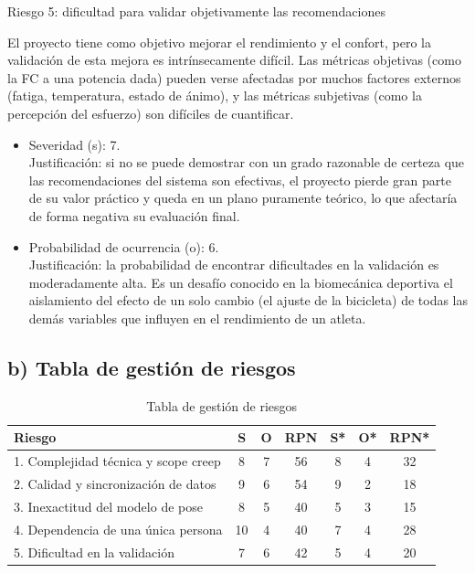 \documentclass[
11pt, %
]{charter}
\begin{document}
Riesgo 5: dificultad para validar objetivamente las recomendaciones

El proyecto tiene como objetivo mejorar el rendimiento y el confort, pero la validación de esta mejora es intrínsecamente difícil. Las métricas objetivas (como la FC a una potencia dada) pueden verse afectadas por muchos factores externos (fatiga, temperatura, estado de ánimo), y las métricas subjetivas (como la percepción del esfuerzo) son difíciles de cuantificar.
\begin{itemize}
    \item Severidad (s): 7.\\
    Justificación: si no se puede demostrar con un grado razonable de certeza que las recomendaciones del sistema son efectivas, el proyecto pierde gran parte de su valor práctico y queda en un plano puramente teórico, lo que afectaría de forma negativa su evaluación final.
    \item Probabilidad de ocurrencia (o): 6.\\
    Justificación: la probabilidad de encontrar dificultades en la validación es moderadamente alta. Es un desafío conocido en la biomecánica deportiva el aislamiento del efecto de un solo cambio (el ajuste de la bicicleta) de todas las demás variables que influyen en el rendimiento de un atleta.
\end{itemize}


\subsection*{b) Tabla de gestión de riesgos}

\begin{table}[htpb]
\centering
\caption{Tabla de gestión de riesgos}
\label{tab:riesgos}
\begin{tabularx}{\linewidth}{@{}|X|c|c|c|c|c|c|@{}}
\hline
\rowcolor[HTML]{C0C0C0} 
Riesgo & S & O & RPN & S* & O* & RPN* \\ \hline
1. Complejidad técnica y scope creep & 8 & 7 & 56 & 8 & 4 & 32 \\ \hline
2. Calidad y sincronización de datos & 9 & 6 & 54 & 9 & 2 & 18 \\ \hline
3. Inexactitud del modelo de pose & 8 & 5 & 40 & 5 & 3 & 15 \\ \hline
4. Dependencia de una única persona & 10 & 4 & 40 & 7 & 4 & 28 \\ \hline
5. Dificultad en la validación & 7 & 6 & 42 & 5 & 4 & 20 \\ \hline
\end{tabularx}%
\end{table}
\end{document}
